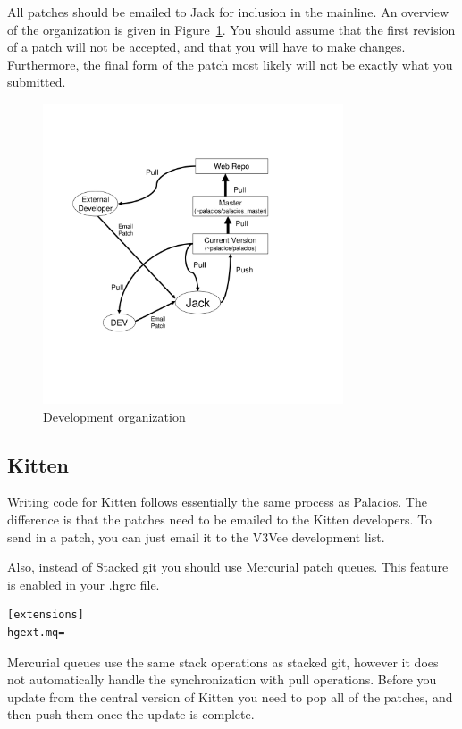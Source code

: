 \documentclass[11pt]{article}
\begin{document}
All patches should be emailed to Jack for inclusion in the
mainline. An overview of the organization is given in
Figure~\ref{fig:process}. You should assume that the first revision of
a patch will not be accepted, and that you will have to make
changes. Furthermore, the final form of the patch most likely will not
be exactly what you submitted. 

 
\begin{figure}[t]
\begin{center}
\includegraphics[height=3.5in]{dev_chart.pdf}
\end{center}
\caption{Development organization}
\label{fig:process}
\end{figure}


\subsection{Kitten}

Writing code for Kitten follows essentially the same process as
Palacios. The difference is that the patches need to be emailed to the
Kitten developers. To send in a patch, you can just email it to the
V3Vee development list.


Also, instead of Stacked git you should use Mercurial patch
queues. This feature is enabled in your .hgrc file.
\begin{verbatim}
[extensions]
hgext.mq=
\end{verbatim}

Mercurial queues use the same stack operations as stacked git, however
it does not automatically handle the synchronization with pull
operations. Before you update from the central version of Kitten you
need to pop all of the patches, and then push them once the update is
complete.
\end{document}
